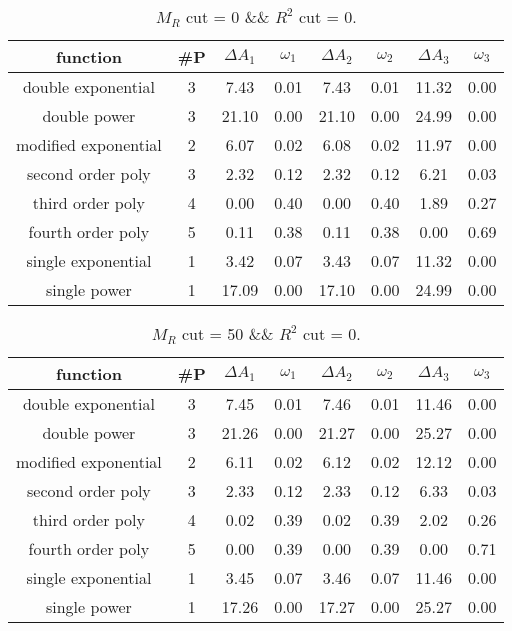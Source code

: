 \begin{table}[H] 
\begin{center} 
\begin{tabular}{|c|c|cc|cc|cc|} 
\hline function & \#P & $\Delta A_1$ & $\omega_1$ & $\Delta A_2$ & $\omega_2$ & $\Delta A_3$ & $\omega_3$ \\ \hline 
double exponential &  3 &   7.43 &   0.01 &   7.43 &   0.01 &  11.32 &   0.00 \\ 
double power &  3 &  21.10 &   0.00 &  21.10 &   0.00 &  24.99 &   0.00 \\ 
modified exponential &  2 &   6.07 &   0.02 &   6.08 &   0.02 &  11.97 &   0.00 \\ 
second order poly &  3 &   2.32 &   0.12 &   2.32 &   0.12 &   6.21 &   0.03 \\ 
third order poly &  4 &   0.00 &   0.40 &   0.00 &   0.40 &   1.89 &   0.27 \\ 
fourth order poly &  5 &   0.11 &   0.38 &   0.11 &   0.38 &   0.00 &   0.69 \\ 
single exponential &  1 &   3.42 &   0.07 &   3.43 &   0.07 &  11.32 &   0.00 \\ 
single power &  1 &  17.09 &   0.00 &  17.10 &   0.00 &  24.99 &   0.00 \\ 
\hline 
\end{tabular} 
\caption{$M_R$ cut = 0 \&\& $R^2$ cut = 0.} 
\label{tab:FitChoices_0_0} 
\end{center} 
\end{table} 
 
 
\begin{table}[H] 
\begin{center} 
\begin{tabular}{|c|c|cc|cc|cc|} 
\hline function & \#P & $\Delta A_1$ & $\omega_1$ & $\Delta A_2$ & $\omega_2$ & $\Delta A_3$ & $\omega_3$ \\ \hline 
double exponential &  3 &   7.45 &   0.01 &   7.46 &   0.01 &  11.46 &   0.00 \\ 
double power &  3 &  21.26 &   0.00 &  21.27 &   0.00 &  25.27 &   0.00 \\ 
modified exponential &  2 &   6.11 &   0.02 &   6.12 &   0.02 &  12.12 &   0.00 \\ 
second order poly &  3 &   2.33 &   0.12 &   2.33 &   0.12 &   6.33 &   0.03 \\ 
third order poly &  4 &   0.02 &   0.39 &   0.02 &   0.39 &   2.02 &   0.26 \\ 
fourth order poly &  5 &   0.00 &   0.39 &   0.00 &   0.39 &   0.00 &   0.71 \\ 
single exponential &  1 &   3.45 &   0.07 &   3.46 &   0.07 &  11.46 &   0.00 \\ 
single power &  1 &  17.26 &   0.00 &  17.27 &   0.00 &  25.27 &   0.00 \\ 
\hline 
\end{tabular} 
\caption{$M_R$ cut = 50 \&\& $R^2$ cut = 0.} 
\label{tab:FitChoices_50_0} 
\end{center} 
\end{table} 
 
